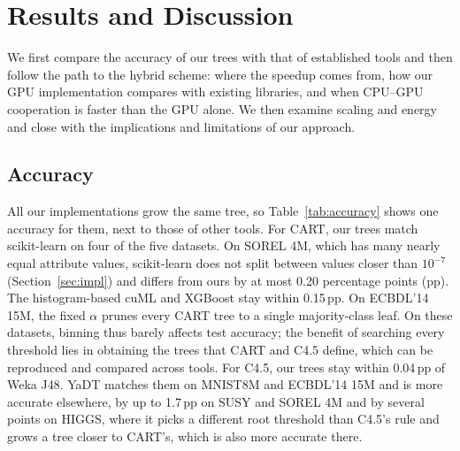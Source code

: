 \section{Results and Discussion}
\label{sec:results}

We first compare the accuracy of our trees with that of established tools and then follow the path to the hybrid scheme: where the speedup comes from, how our GPU implementation compares with existing libraries, and when CPU--GPU cooperation is faster than the GPU alone. We then examine scaling and energy and close with the implications and limitations of our approach.

\subsection{Accuracy}
\label{sec:accuracy}
All our implementations grow the same tree, so Table~\ref{tab:accuracy} shows one accuracy for them, next to those of other tools. For CART, our trees match scikit-learn on four of the five datasets. On SOREL 4M, which has many nearly equal attribute values, scikit-learn does not split between values closer than $10^{-7}$ (Section~\ref{sec:impl}) and differs from ours by at most 0.20 percentage points (pp). The histogram-based cuML and XGBoost stay within 0.15\,pp. On ECBDL'14 15M, the fixed $\alpha$ prunes every CART tree to a single majority-class leaf. On these datasets, binning thus barely affects test accuracy; the benefit of searching every threshold lies in obtaining the trees that CART and C4.5 define, which can be reproduced and compared across tools. For C4.5, our trees stay within 0.04\,pp of Weka J48. YaDT matches them on MNIST8M and ECBDL'14 15M and is more accurate elsewhere, by up to 1.7\,pp on SUSY and SOREL 4M and by several points on HIGGS, where it picks a different root threshold than C4.5's rule and grows a tree closer to CART's, which is also more accurate there.

